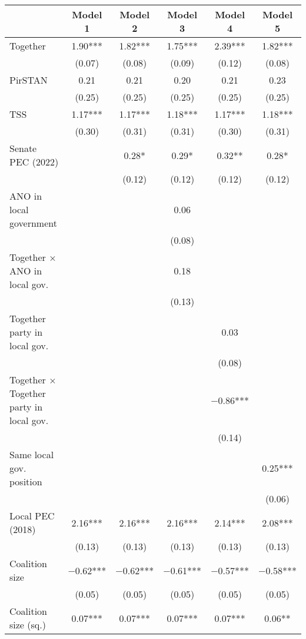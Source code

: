 \begin{table}
\centering
\begin{tabular}[t]{lccccc}
\toprule
  & Model 1 & Model 2 & Model 3 & Model 4 & Model 5\\
\midrule
Together & \num{1.90}*** & \num{1.82}*** & \num{1.75}*** & \num{2.39}*** & \num{1.82}***\\
 & (\num{0.07}) & (\num{0.08}) & (\num{0.09}) & (\num{0.12}) & (\num{0.08})\\
PirSTAN & \num{0.21} & \num{0.21} & \num{0.20} & \num{0.21} & \num{0.23}\\
 & (\num{0.25}) & (\num{0.25}) & (\num{0.25}) & (\num{0.25}) & (\num{0.25})\\
TSS & \num{1.17}*** & \num{1.17}*** & \num{1.18}*** & \num{1.17}*** & \num{1.18}***\\
 & (\num{0.30}) & (\num{0.31}) & (\num{0.31}) & (\num{0.30}) & (\num{0.31})\\
Senate PEC (2022) &  & \num{0.28}* & \num{0.29}* & \num{0.32}** & \num{0.28}*\\
 &  & (\num{0.12}) & (\num{0.12}) & (\num{0.12}) & (\num{0.12})\\
ANO in local government &  &  & \num{0.06} &  & \\
 &  &  & (\num{0.08}) &  & \\
Together × ANO in local gov. &  &  & \num{0.18} &  & \\
 &  &  & (\num{0.13}) &  & \\
Together party in local gov. &  &  &  & \num{0.03} & \\
 &  &  &  & (\num{0.08}) & \\
Together × Together party in local gov. &  &  &  & \num{-0.86}*** & \\
 &  &  &  & (\num{0.14}) & \\
Same local gov. position &  &  &  &  & \num{0.25}***\\
 &  &  &  &  & (\num{0.06})\\
Local PEC (2018) & \num{2.16}*** & \num{2.16}*** & \num{2.16}*** & \num{2.14}*** & \num{2.08}***\\
 & (\num{0.13}) & (\num{0.13}) & (\num{0.13}) & (\num{0.13}) & (\num{0.13})\\
Coalition size & \num{-0.62}*** & \num{-0.62}*** & \num{-0.61}*** & \num{-0.57}*** & \num{-0.58}***\\
 & (\num{0.05}) & (\num{0.05}) & (\num{0.05}) & (\num{0.05}) & (\num{0.05})\\
Coalition size (sq.) & \num{0.07}*** & \num{0.07}*** & \num{0.07}*** & \num{0.07}*** & \num{0.06}**\\

\end{tabular}
\end{table}
